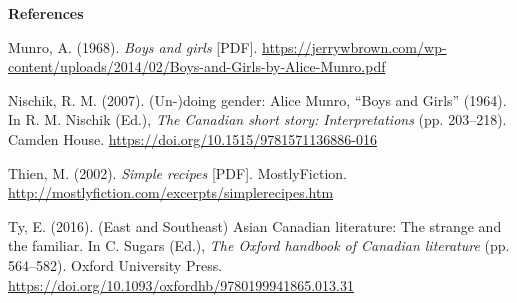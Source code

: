 \documentclass[12pt]{article}
\begin{document}
\clearpage

\begin{center}
\textbf{References}
\end{center}

\hangindent=0.5in\noindent Munro, A. (1968). \textit{Boys and girls} [PDF]. \url{https://jerrywbrown.com/wp-content/uploads/2014/02/Boys-and-Girls-by-Alice-Munro.pdf}

\hangindent=0.5in\noindent Nischik, R. M. (2007). (Un-)doing gender: Alice Munro, ``Boys and Girls'' (1964). In R. M. Nischik (Ed.), \textit{The Canadian short story: Interpretations} (pp. 203--218). Camden House. \url{https://doi.org/10.1515/9781571136886-016}

\hangindent=0.5in\noindent Thien, M. (2002). \textit{Simple recipes} [PDF]. MostlyFiction. \url{http://mostlyfiction.com/excerpts/simplerecipes.htm}

\hangindent=0.5in\noindent Ty, E. (2016). (East and Southeast) Asian Canadian literature: The strange and the familiar. In C. Sugars (Ed.), \textit{The Oxford handbook of Canadian literature} (pp. 564--582). Oxford University Press. \url{https://doi.org/10.1093/oxfordhb/9780199941865.013.31}
\end{document}
